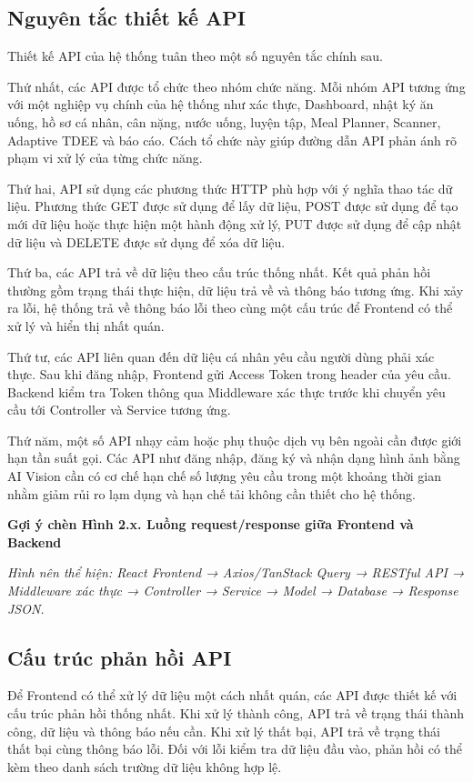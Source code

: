 \documentclass[12pt, a4paper]{report}
\begin{document}
\subsection{Nguyên tắc thiết kế API}Thiết kế API của hệ thống tuân theo một số nguyên tắc chính sau.

Thứ nhất, các API được tổ chức theo nhóm chức năng. Mỗi nhóm API tương ứng với một nghiệp vụ chính của hệ thống như xác thực, Dashboard, nhật ký ăn uống, hồ sơ cá nhân, cân nặng, nước uống, luyện tập, Meal Planner, Scanner, Adaptive TDEE và báo cáo. Cách tổ chức này giúp đường dẫn API phản ánh rõ phạm vi xử lý của từng chức năng.

Thứ hai, API sử dụng các phương thức HTTP phù hợp với ý nghĩa thao tác dữ liệu. Phương thức GET được sử dụng để lấy dữ liệu, POST được sử dụng để tạo mới dữ liệu hoặc thực hiện một hành động xử lý, PUT được sử dụng để cập nhật dữ liệu và DELETE được sử dụng để xóa dữ liệu.

Thứ ba, các API trả về dữ liệu theo cấu trúc thống nhất. Kết quả phản hồi thường gồm trạng thái thực hiện, dữ liệu trả về và thông báo tương ứng. Khi xảy ra lỗi, hệ thống trả về thông báo lỗi theo cùng một cấu trúc để Frontend có thể xử lý và hiển thị nhất quán.

Thứ tư, các API liên quan đến dữ liệu cá nhân yêu cầu người dùng phải xác thực. Sau khi đăng nhập, Frontend gửi Access Token trong header của yêu cầu. Backend kiểm tra Token thông qua Middleware xác thực trước khi chuyển yêu cầu tới Controller và Service tương ứng.

Thứ năm, một số API nhạy cảm hoặc phụ thuộc dịch vụ bên ngoài cần được giới hạn tần suất gọi. Các API như đăng nhập, đăng ký và nhận dạng hình ảnh bằng AI Vision cần có cơ chế hạn chế số lượng yêu cầu trong một khoảng thời gian nhằm giảm rủi ro lạm dụng và hạn chế tải không cần thiết cho hệ thống.

\textbf{Gợi ý chèn Hình 2.x. Luồng request/response giữa Frontend và Backend}

\textit{Hình nên thể hiện: React Frontend → Axios/TanStack Query → RESTful API → Middleware xác thực → Controller → Service → Model → Database → Response JSON.}

\subsection{Cấu trúc phản hồi API}Để Frontend có thể xử lý dữ liệu một cách nhất quán, các API được thiết kế với cấu trúc phản hồi thống nhất. Khi xử lý thành công, API trả về trạng thái thành công, dữ liệu và thông báo nếu cần. Khi xử lý thất bại, API trả về trạng thái thất bại cùng thông báo lỗi. Đối với lỗi kiểm tra dữ liệu đầu vào, phản hồi có thể kèm theo danh sách trường dữ liệu không hợp lệ.
\end{document}
